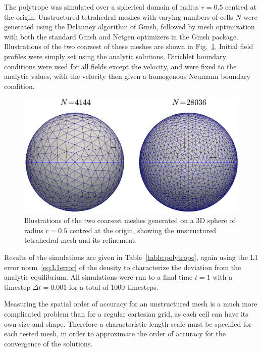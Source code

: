 The polytrope was simulated over a spherical domain of radius $r=0.5$ centred at the origin. Unstructured tetrahedral meshes with varying numbers of cells $N$ were generated using the Delauney algorithm of Gmsh, followed by mesh optimization with both the standard Gmsh and Netgen optimizers in the Gmsh package. Illustrations of the two coarsest of these meshes are shown in Fig.~\ref{fig:sphere_meshes}. Initial field profiles were simply set using the analytic solutions. Dirichlet boundary conditions were used for all fields except the velocity, and were fixed to the analytic values, with the velocity then given a homogenous Neumann boundary condition.

\begin {figure}
\centering
\includegraphics[width=13cm]{figures/sphere_meshes}
\caption {Illustrations of the two coarsest meshes generated on a 3D sphere of radius $r=0.5$ centred at the origin, showing the unstructured tetrahedral mesh and its refinement.}
\label{fig:sphere_meshes}
\end{figure}

Results of the simulations are given in Table~\ref{table:polytrope}, again using the L1 error norm~\eqref{eq:L1error} of the density to characterize the deviation from the analytic equilibrium. All simulations were run to a final time $t=1$ with a timestep $\Delta t=0.001$ for a total of $1000$ timesteps.

Measuring the spatial order of accuracy for an unstructured mesh is a much more complicated problem than for a regular cartesian grid, as each cell can have its own size and shape. Therefore a characteristic length scale must be specified for each tested mesh, in order to approximate the order of accuracy for the convergence of the solutions.

